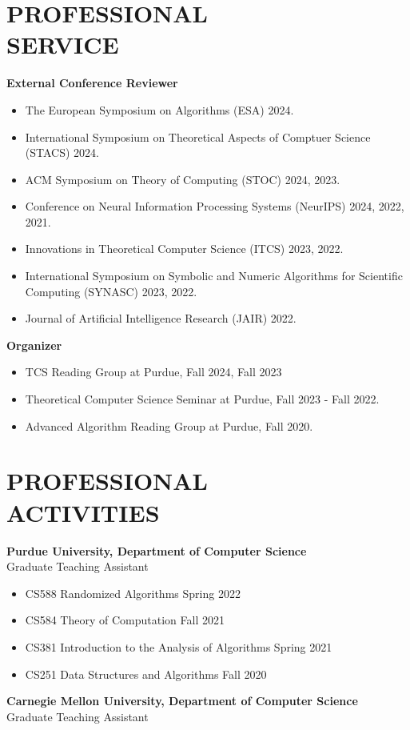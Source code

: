 \documentclass[margin, 10pt]{res} %
\begin{document}
\begin{resume}
\section{PROFESSIONAL \\ SERVICE}

{\bf External Conference Reviewer}

\begin{itemize}
\item The European Symposium on Algorithms (ESA) 2024.
\item International Symposium on Theoretical Aspects of Comptuer Science (STACS) 2024.
\item ACM Symposium on Theory of Computing (STOC) 2024, 2023.
\item Conference on Neural Information Processing Systems (NeurIPS) 2024, 2022, 2021.
\item Innovations in Theoretical Computer Science (ITCS) 2023, 2022.
\item International Symposium on Symbolic and Numeric Algorithms for Scientific Computing (SYNASC) 2023, 2022.
\item Journal of Artificial Intelligence Research (JAIR) 2022.
\end{itemize}
{\bf Organizer}

\begin{itemize}
\item TCS Reading Group at Purdue, Fall 2024, Fall 2023
\item Theoretical Computer Science Seminar at Purdue, Fall 2023 - Fall 2022.
\item Advanced Algorithm Reading Group at Purdue, Fall 2020.
\end{itemize}


\section{PROFESSIONAL \\ ACTIVITIES}

{\bf Purdue University, Department of Computer Science}\\
Graduate Teaching Assistant

\begin{itemize}
\item CS588 Randomized Algorithms \hfill Spring 2022
\item CS584 Theory of Computation \hfill Fall 2021
\item CS381 Introduction to the Analysis of Algorithms \hfill Spring 2021
\item CS251 Data Structures and Algorithms \hfill Fall 2020
\end{itemize}
{\bf Carnegie Mellon University, Department of Computer Science}\\
Graduate Teaching Assistant


\end{resume}
\end{document}
